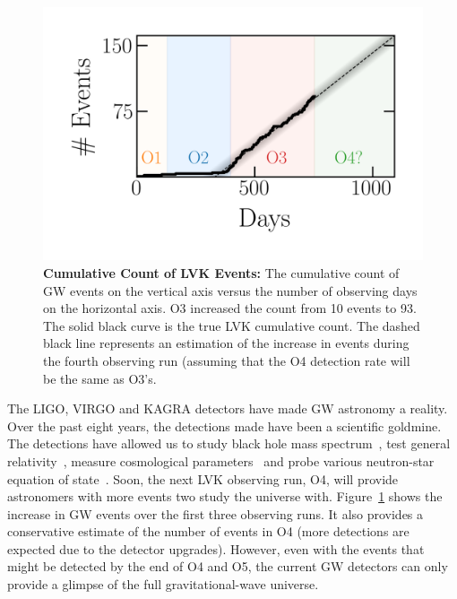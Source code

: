 \begin{figure}
\begin{center}
\centerline{\includegraphics[width=1.\linewidth]{src/figures/gw_detection_timeframe.png}}
  \caption{\textbf{Cumulative Count of LVK Events:} The cumulative count of GW events on the vertical axis versus the number of observing days on the horizontal axis. O3 increased the count from 10 events to 93. The solid black curve is the true LVK cumulative count. The dashed black line represents an estimation of the increase in events during the fourth observing run (assuming that the O4 detection rate will be the same as O3's.  }
  \label{fig:accumulation_of_gw_events}
\end{center}
\end{figure}

The LIGO, VIRGO and KAGRA detectors have made GW astronomy a reality. 
Over the past eight years, the detections made have been a scientific goldmine. 
The detections have allowed us to study black hole mass spectrum~\cite{}, test general relativity~\cite{}, measure cosmological parameters~\cite{} and probe various neutron-star equation of state~\cite{}. 
Soon, the next LVK observing run, O4, will provide astronomers with more events two study the universe with. 
Figure~\ref{fig:accumulation_of_gw_events} shows the increase in GW events over the first three observing runs. 
It also provides a conservative estimate of the number of events in O4 (more detections are expected due to the detector upgrades).
However, even with the events that might be detected by the end of O4 and O5, the current GW detectors can only provide a glimpse of the full gravitational-wave universe. 

